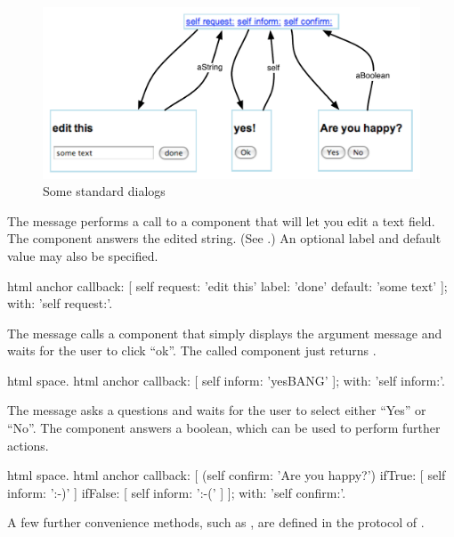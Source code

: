 \documentclass[a4paper,10pt,twoside]{book}
\begin{document}
\begin{figure}[ht]
\begin{center}
\includegraphics[width=\textwidth]{dialogs}
\caption{Some standard dialogs}
\label{fig:dialogs}
\end{center}
\end{figure}

The message  performs a call to a component that will let you edit a text field.
The component answers the edited string.
(See .)
An optional label and default value may also be specified.

\begin{code}{}
html anchor
	callback: [ self request: 'edit this' label: 'done' default: 'some text' ];
	with: 'self request:'.
\end{code}

The message  calls a component that simply displays the argument message and waits for the user to click ``ok''.
The called component just returns .

\begin{code}{}
html space.
html anchor
	callback: [ self inform: 'yesBANG' ];
	with: 'self inform:'.
\end{code}

The message  asks a questions and waits for the user to select either ``Yes'' or ``No''.
The component answers a boolean, which can be used to perform further actions.

\begin{code}{}
html space.
html anchor
	callback: [
		(self confirm: 'Are you happy?')
			ifTrue: [ self inform: ':-)' ]
			ifFalse: [ self inform: ':-(' ]
		];
	with: 'self confirm:'.
\end{code}

A few further convenience methods, such as , are defined in the  protocol of .
\end{document}
